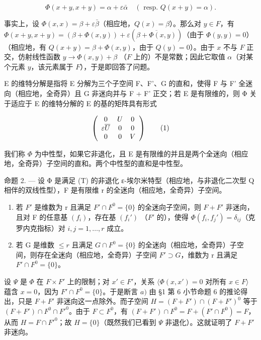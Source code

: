 \[
\Phi (x + y, x + y) = \alpha + \varepsilon \bar {\alpha} \quad (\text { resp. } Q (x + y) = \alpha).
\]

事实上，设 \(\Phi(x, x) = \beta + \varepsilon\bar{\beta}\)（相应地，\(Q(x) = \beta\)）。那么对 \(y \in F\)，有 \(\Phi(x + y, x + y) = (\beta + \Phi(x, y)) + \varepsilon(\overline{\beta + \Phi(x, y)})\)（由于 \(\Phi(y, y) = 0\)）（相应地，有 \(Q(x + y) = \beta + \Phi(x, y)\)，由于 \(Q(y) = 0\)）。由于 \(x\) 不与 \(F\) 正交，仿射线性函数 \(y \to \Phi(x, y) + \beta\) （\(F\) 上的）不是常数；因此它取值 \(\alpha\)（对某个元素 \(y\)，该元素属于 \(F\)），于是即回答了问题。

E 的维特分解是指将 E 分解为三个子空间 F、F'、G 的直和，使得 F 与 F' 全迷向（相应地，全奇异）且 G 非迷向并与 F + F' 正交；若 E 是有限维的，则 Φ 关于适应于 E 的维特分解的 E 的基的矩阵具有形式

\[
\left( \begin{array}{c c c} 0 & U & 0 \\ \varepsilon \overline {{U}} & 0 & 0 \\ 0 & 0 & V \end{array} \right)\tag{1}
\]

我们称 \(\Phi\) 为中性型，如果它非退化，且 E 是有限维的并且是两个全迷向（相应地，全奇异）子空间的直和。两个中性型的直和是中性型。

命题 2. --- 设 Φ 是满足 (T) 的非退化 ε-埃尔米特型（相应地，与非退化二次型 Q 相伴的双线性型），F 是有限维 r 的全迷向（相应地，全奇异）子空间。

\begin{enumerate}
\def\labelenumi{\alph{enumi})}
\item
  若 \(F'\) 是维数为 r 且满足 \(F' \cap F^{0} = \{0\}\) 的全迷向子空间，则 \(F + F'\) 非迷向，且对 F 的任意基 \((f_{i})\)，存在基 \((f_{i}')\) （\(F'\) 的），使得 \(\Phi(f_{i}, f_{j}') = \delta_{ij}\)（克罗内克指标）对 \(i, j = 1, \ldots, r\) 成立。
\item
  若 G 是维数 \(\leqslant r\) 且满足 \(G \cap F^{0} = \{0\}\) 的全迷向（相应地，全奇异）子空间，则存在全迷向（相应地，全奇异）子空间 \(F' \supset G\)，维数为 r 且满足 \(F' \cap F^{0} = \{0\}\)。
\end{enumerate}

设 \(\Psi\) 是 \(\Phi\) 在 \(F \times F'\) 上的限制；对 \(x' \in F'\)，关系 \(\langle \Phi(x, x') = 0\) 对所有 \(x \in F\rangle\) 蕴含 \(x = 0\)，因为 \(F' \cap F^0 = \{0\}\)。于是断言 \(a)\) 由 §1 第 6 小节命题 6 的推论得出，只是 \(F + F'\) 非迷向这一点除外。而子空间 \(H = (F + F') \cap (F + F')^0\) 等于 \((F + F') \cap F^0 \cap F'^0\)。由于 \(F \subset F^0\)，有 \((F + F') \cap F^0 = F + (F' \cap F^0) = F\)，从而 \(H = F \cap F'^0\)；故 \(H = \{0\}\)（既然我们已看到 \(\Psi\) 非退化）。这就证明了 \(F + F'\) 非迷向。

